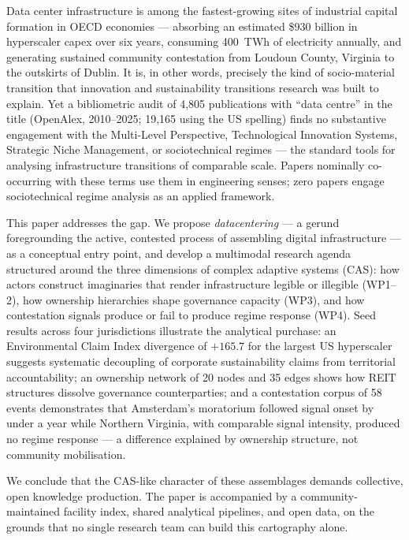 Data center infrastructure is among the fastest-growing sites of industrial capital formation in OECD economies — absorbing an estimated \$930 billion in hyperscaler capex over six years, consuming 400~TWh of electricity annually, and generating sustained community contestation from Loudoun County, Virginia to the outskirts of Dublin. It is, in other words, precisely the kind of socio-material transition that innovation and sustainability transitions research was built to explain. Yet a bibliometric audit of 4,805 publications with ``data centre'' in the title (OpenAlex, 2010--2025; 19,165 using the US spelling) finds no substantive engagement with the Multi-Level Perspective, Technological Innovation Systems, Strategic Niche Management, or sociotechnical regimes --- the standard tools for analysing infrastructure transitions of comparable scale. Papers nominally co-occurring with these terms use them in engineering senses; zero papers engage sociotechnical regime analysis as an applied framework.

This paper addresses the gap. We propose \textit{datacentering} — a gerund foregrounding the active, contested process of assembling digital infrastructure — as a conceptual entry point, and develop a multimodal research agenda structured around the three dimensions of complex adaptive systems (CAS): how actors construct imaginaries that render infrastructure legible or illegible (WP1--2), how ownership hierarchies shape governance capacity (WP3), and how contestation signals produce or fail to produce regime response (WP4). Seed results across four jurisdictions illustrate the analytical purchase: an Environmental Claim Index divergence of $+165.7$ for the largest US hyperscaler suggests systematic decoupling of corporate sustainability claims from territorial accountability; an ownership network of 20 nodes and 35 edges shows how REIT structures dissolve governance counterparties; and a contestation corpus of 58 events demonstrates that Amsterdam's moratorium followed signal onset by under a year while Northern Virginia, with comparable signal intensity, produced no regime response — a difference explained by ownership structure, not community mobilisation.

We conclude that the CAS-like character of these assemblages demands collective, open knowledge production. The paper is accompanied by a community-maintained facility index, shared analytical pipelines, and open data, on the grounds that no single research team can build this cartography alone.
